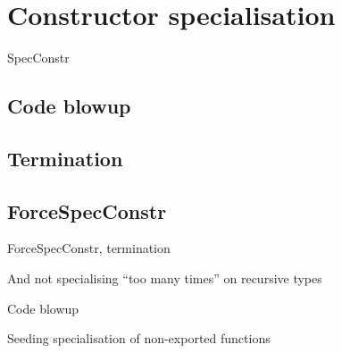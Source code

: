 \documentclass{tmr}
\begin{document}
\section{Constructor specialisation}

SpecConstr

\subsection{Code blowup}
\subsection{Termination}
\subsection{ForceSpecConstr}

ForceSpecConstr, termination

And not specialising ``too many times'' on recursive types

Code blowup

Seeding specialisation of non-exported functions
\end{document}
